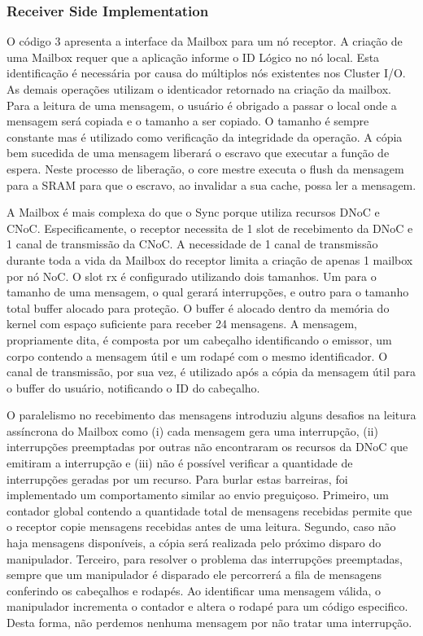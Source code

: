			\subsubsection{Receiver Side Implementation}

				O código 3 apresenta a interface da Mailbox para um nó receptor.
				A criação de uma Mailbox requer que a aplicação informe o ID Lógico no nó local.
				Esta identificação é necessária por causa do múltiplos nós existentes nos Cluster I/O.
				As demais operações utilizam o identicador retornado na criação da mailbox.
				Para a leitura de uma mensagem, o usuário é obrigado a passar o local onde a mensagem será copiada e o tamanho a ser copiado.
				O tamanho é sempre constante mas é utilizado como verificação da integridade da operação.
				A cópia bem sucedida de uma mensagem liberará o escravo que executar a função de espera.
				Neste processo de liberação, o core mestre executa o flush da mensagem para a SRAM para que o escravo, ao invalidar a sua cache, possa ler a mensagem.

				A Mailbox é mais complexa do que o Sync porque utiliza recursos DNoC e CNoC.
				Especificamente, o receptor necessita de 1 slot de recebimento da DNoC e 1 canal de transmissão da CNoC.
				A necessidade de 1 canal de transmissão durante toda a vida da Mailbox do receptor limita a criação de apenas 1 mailbox por nó NoC.
				O slot rx é configurado utilizando dois tamanhos.
				Um para o tamanho de uma mensagem, o qual gerará interrupções, e outro para o tamanho total buffer alocado para proteção.
				O buffer é alocado dentro da memória do kernel com espaço suficiente para receber 24 mensagens.
				A mensagem, propriamente dita, é composta por um cabeçalho identificando o emissor, um corpo contendo a mensagem útil e um rodapé com o mesmo identificador.
				O canal de transmissão, por sua vez, é utilizado após a cópia da mensagem útil para o buffer do usuário, notificando o ID do cabeçalho.

				O paralelismo no recebimento das mensagens introduziu alguns desafios na leitura assíncrona do Mailbox como 
				(i) cada mensagem gera uma interrupção,
				(ii) interrupções preemptadas por outras não encontraram os recursos da DNoC que emitiram a interrupção e
				(iii) não é possível verificar a quantidade de interrupções geradas por um recurso.
				Para burlar estas barreiras, foi implementado um comportamento similar ao envio preguiçoso.
				Primeiro, um contador global contendo a quantidade total de mensagens recebidas permite que o receptor copie mensagens recebidas antes de uma leitura.
				Segundo, caso não haja mensagens disponíveis, a cópia será realizada pelo próximo disparo do manipulador.
				Terceiro, para resolver o problema das interrupções preemptadas, sempre que um manipulador é disparado ele percorrerá a fila de mensagens conferindo os cabeçalhos e rodapés.
				Ao identificar uma mensagem válida, o manipulador incrementa o contador e altera o rodapé para um código especifico.
				Desta forma, não perdemos nenhuma mensagem por não tratar uma interrupção.

